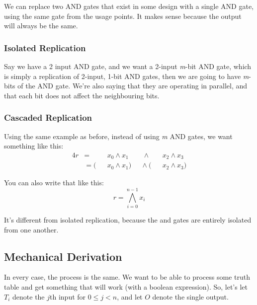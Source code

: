 \documentclass[11pt,a4paper,titlepage,dvipsnames,cmyk]{scrartcl}
\begin{document}
We can replace two AND gates that exist in some design with a single AND
gate, using the same gate from the usage points.  It makes sense because
the output will always be the same.

\subsubsection{Isolated Replication}%
\label{ssub:isolated}

Say we have a 2 input AND gate, and we want a 2-input \textit{m}-bit AND
gate, which is simply a replication of 2-input, 1-bit AND gates, then we
are going to have \textit{m}-bits of the AND gate. We're also saying that
they are operating in parallel, and that each bit does not affect the
neighbouring bits.

\subsubsection{Cascaded Replication}%
\label{ssub:cascaded}

Using the same example as before, instead of using \textit{m} AND gates,
we want something like this:
\begin{alignat*}{4}
    r &= & &x_0 \wedge x_1   &&\ \wedge \ & &x_2 \wedge x_3 \\
      &= (& &x_0 \wedge x_1) &&\wedge \ (& &x_2 \wedge x_3)
\end{alignat*}

You can also write that like this:
\begin{equation*}
    r = \bigwedge^{n-1}_{i=0} x_i
\end{equation*}

It's different from isolated replication, because the and gates are
entirely isolated from one another.

\subsection{Mechanical Derivation}%
\label{sub:mechanical}
In every case, the process is the same. We want to be able to process some
truth table and get something that will work (with a boolean expression).
So, let's let $T_i$ denote the $j$th input for $0 \le j < n$, and let $O$
denote the single output.
\end{document}
